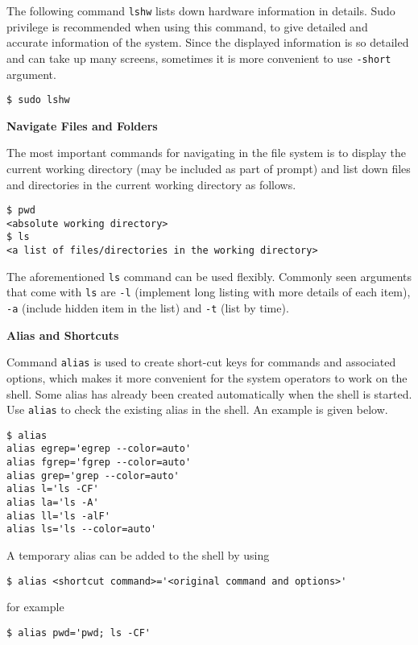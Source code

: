 The following command \verb|lshw| lists down hardware information in details. Sudo privilege is recommended when using this command, to give detailed and accurate information of the system. Since the displayed information is so detailed and can take up many screens, sometimes it is more convenient to use \verb|-short| argument.
\begin{verbatim}
$ sudo lshw
\end{verbatim}

\vspace{0.1in}
\noindent \textbf{Navigate Files and Folders}
\vspace{0.1in}

The most important commands for navigating in the file system is to display the current working directory (may be included as part of prompt) and list down files and directories in the current working directory as follows.
\begin{verbatim}
$ pwd
<absolute working directory>
$ ls
<a list of files/directories in the working directory>
\end{verbatim}

The aforementioned \verb|ls| command can be used flexibly. Commonly seen arguments that come with \verb|ls| are \verb|-l| (implement long listing with more details of each item), \verb|-a| (include hidden item in the list) and \verb|-t| (list by time).

\vspace{0.1in}
\noindent \textbf{Alias and Shortcuts}
\vspace{0.1in}

Command \verb|alias| is used to create short-cut keys for commands and associated options, which makes it more convenient for the system operators to work on the shell. Some alias has already been created automatically when the shell is started. Use \verb|alias| to check the existing alias in the shell. An example is given below.

\begin{verbatim}
$ alias
alias egrep='egrep --color=auto'
alias fgrep='fgrep --color=auto'
alias grep='grep --color=auto'
alias l='ls -CF'
alias la='ls -A'
alias ll='ls -alF'
alias ls='ls --color=auto'
\end{verbatim}

A temporary alias can be added to the shell by using 
\begin{verbatim}
$ alias <shortcut command>='<original command and options>'
\end{verbatim}
for example
\begin{verbatim}
$ alias pwd='pwd; ls -CF'
\end{verbatim}

